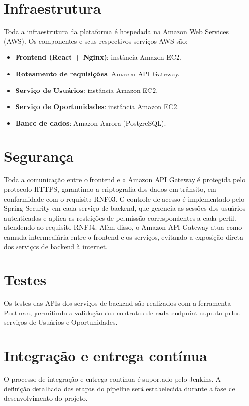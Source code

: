 \documentclass[
    12pt,
    oneside,
    a4paper,
    brazil
]{abntex2}
\begin{document}
\section{Infraestrutura}

Toda a infraestrutura da plataforma é hospedada na Amazon Web Services (AWS). Os componentes e seus respectivos serviços AWS são:

\begin{itemize}
    \item \textbf{Frontend (React + Nginx)}: instância Amazon EC2.
    \item \textbf{Roteamento de requisições}: Amazon API Gateway.
    \item \textbf{Serviço de Usuários}: instância Amazon EC2.
    \item \textbf{Serviço de Oportunidades}: instância Amazon EC2.
    \item \textbf{Banco de dados}: Amazon Aurora (PostgreSQL).
\end{itemize}

\section{Segurança}

Toda a comunicação entre o frontend e o Amazon API Gateway é protegida pelo protocolo HTTPS, garantindo a criptografia dos dados em trânsito, em conformidade com o requisito RNF03. O controle de acesso é implementado pelo Spring Security em cada serviço de backend, que gerencia as sessões dos usuários autenticados e aplica as restrições de permissão correspondentes a cada perfil, atendendo ao requisito RNF04. Além disso, o Amazon API Gateway atua como camada intermediária entre o frontend e os serviços, evitando a exposição direta dos serviços de backend à internet.

\section{Testes}

Os testes das APIs dos serviços de backend são realizados com a ferramenta Postman, permitindo a validação dos contratos de cada endpoint exposto pelos serviços de Usuários e Oportunidades.

\section{Integração e entrega contínua}

O processo de integração e entrega contínua é suportado pelo Jenkins. A definição detalhada das etapas do pipeline será estabelecida durante a fase de desenvolvimento do projeto.
\end{document}
